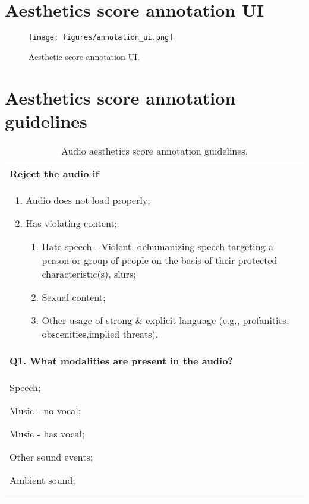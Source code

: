 \section{Aesthetics score annotation UI}
\label{sec:app_ui}
\begin{figure}[ht]
    \centering
    \texttt{[image: figures/annotation\_ui.png]}
    \caption{Aesthetic score annotation UI.}
    \label{fig:annotation_ui}
\end{figure}

\section{Aesthetics score annotation guidelines}
\label{sec:app_guidelines}

\begin{table*}[ht]
    \centering
    \caption{Audio aesthetics score annotation guidelines.}
\begin{tabular}{p{15cm}}
\toprule\toprule
\textbf{Reject the audio if}\\
\begin{enumerate}[leftmargin=.75cm]
    \item Audio does not load properly;
    \item Has violating content;
    \begin{enumerate}
        \item Hate speech - Violent, dehumanizing speech targeting a person or group of people on the basis of their protected characteristic(s), slurs;
        \item Sexual content;
        \item Other usage of strong \& explicit language (e.g., profanities, obscenities,implied threats).
    \end{enumerate}
\end{enumerate}\\

\textbf{Q1. What modalities are present in the audio?}\\
\begin{todolist}[leftmargin=.75cm]
  \item Speech;
  \item Music - no vocal;
  \item Music - has vocal;
  \item Other sound events;
  \item Ambient sound;
\end{todolist}\\


\end{tabular}
\end{table*}
